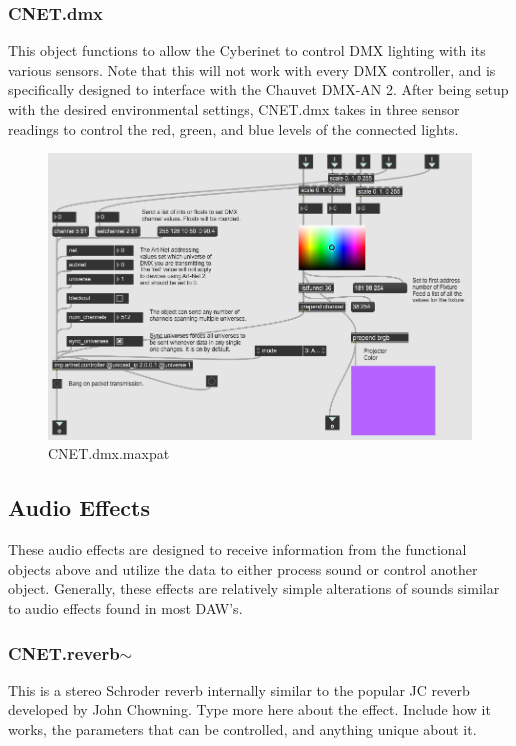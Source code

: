 \subsubsection{CNET.dmx}
This object functions to allow the Cyberinet to control DMX lighting with its various sensors. Note that this will not work with every DMX controller, and is specifically designed to interface with the Chauvet DMX-AN 2. After being setup with the desired environmental settings, CNET.dmx takes in three sensor readings to control the red, green, and blue levels of the connected lights.

\begin{figure}
    \centering
    \includegraphics[scale=0.85]{diagrams/maxPatches/CNET.dmx.png}
    \caption{CNET.dmx.maxpat}
    \label{fig:CNET.dmx.maxpat}
\end{figure}

\subsection{Audio Effects}
These audio effects are designed to receive information from the functional objects above and utilize the data to either process sound or control another object. Generally, these effects are relatively simple alterations of sounds similar to audio effects found in most DAW's.

\subsubsection{CNET.reverb$\sim$}
This is a stereo Schroder reverb internally similar to the popular JC reverb developed by John Chowning. Type more here about the effect. Include how it works, the parameters that can be controlled, and anything unique about it. 

